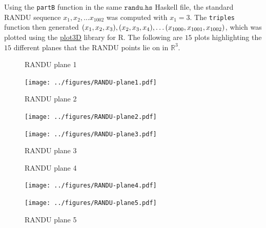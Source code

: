 \documentclass{article}
\DeclarePairedDelimiter \parens{(}{)}
\begin{document}
\begin{enumerate}
\begin{enumerate}
                Using the \texttt{partB} function in the same $\texttt{randu.hs}$ Haskell file,
                the standard RANDU sequence $x_1, x_2, \dots x_{1002}$ was computed with $x_1 = 3$.
                The \texttt{triples} function then generated $\parens*{x_1, x_2, x_3}, \parens*{x_2, x_3, x_4}, \dots \parens*{x_{1000}, x_{1001}, x_{1002}}$,
                which was plotted using the \href{https://cran.r-project.org/web/packages/plot3D/index.html}{plot3D} library for R.
                The following are $15$ plots highlighting the $15$ different planes that the RANDU points lie on in $\mathbb{R}^3$.
                \begin{figure}[H]
                    \centering
                    \begin{minipage}{.3\textwidth}
                        \centering
                        \caption{RANDU plane 1}
                        \texttt{[image: ../figures/RANDU-plane1.pdf]}
                    \end{minipage}
                    \begin{minipage}{.3\textwidth}
                        \centering
                        \caption{RANDU plane 2}
                        \texttt{[image: ../figures/RANDU-plane2.pdf]}
                    \end{minipage}
                    \begin{minipage}{.3\textwidth}
                        \centering
                        \caption{RANDU plane 3}
                        \texttt{[image: ../figures/RANDU-plane3.pdf]}
                    \end{minipage}
                \end{figure}
                \begin{figure}[H]
                    \centering
                    \begin{minipage}{.3\textwidth}
                        \centering
                        \caption{RANDU plane 4}
                        \texttt{[image: ../figures/RANDU-plane4.pdf]}
                    \end{minipage}
                    \begin{minipage}{.3\textwidth}
                        \centering
                        \caption{RANDU plane 5}
                        \texttt{[image: ../figures/RANDU-plane5.pdf]}
                    \end{minipage}
                    \begin{minipage}{.3\textwidth}
                        \centering

\end{minipage}
\end{figure}
\end{enumerate}
\end{enumerate}
\end{document}
